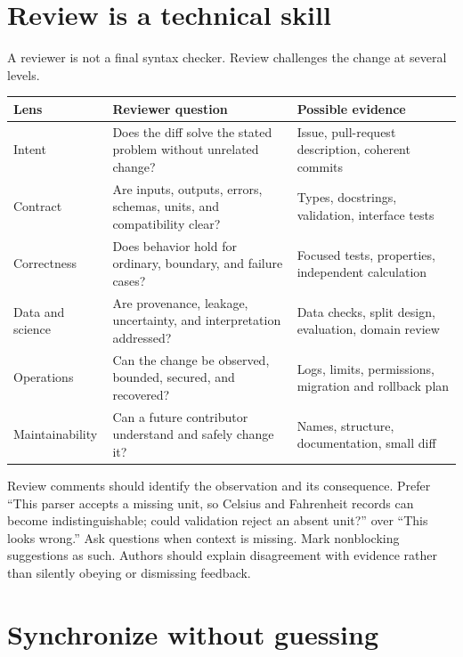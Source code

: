 \section{Review is a technical skill}

A reviewer is not a final syntax checker. Review challenges the change at
several levels.

\begin{center}
\small
\begin{tabularx}{\textwidth}{@{}
  >{\raggedright\arraybackslash}p{}
  >{\raggedright\arraybackslash}X
  >{\raggedright\arraybackslash}X@{}}
\toprule
\textbf{Lens} & \textbf{Reviewer question} & \textbf{Possible evidence} \\
\midrule
Intent & Does the diff solve the stated problem without unrelated change? &
Issue, pull-request description, coherent commits \\
Contract & Are inputs, outputs, errors, schemas, units, and compatibility clear? &
Types, docstrings, validation, interface tests \\
Correctness & Does behavior hold for ordinary, boundary, and failure cases? &
Focused tests, properties, independent calculation \\
Data and science & Are provenance, leakage, uncertainty, and interpretation
addressed? & Data checks, split design, evaluation, domain review \\
Operations & Can the change be observed, bounded, secured, and recovered? &
Logs, limits, permissions, migration and rollback plan \\
Maintainability & Can a future contributor understand and safely change it? &
Names, structure, documentation, small diff \\
\bottomrule
\end{tabularx}
\end{center}

Review comments should identify the observation and its consequence. Prefer
``This parser accepts a missing unit, so Celsius and Fahrenheit records can
become indistinguishable; could validation reject an absent unit?'' over ``This
looks wrong.'' Ask questions when context is missing. Mark nonblocking
suggestions as such. Authors should explain disagreement with evidence rather
than silently obeying or dismissing feedback.

\section{Synchronize without guessing}

